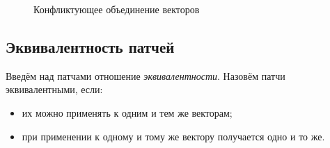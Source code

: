 \begin{figure}
  \centering
  \caption{Конфликтующее объединение векторов}
  \label{fig:vec-merge-conflict}
\end{figure}


\subsection{Эквивалентность патчей}

Введём над патчами отношение \emph{эквивалентности}. Назовём патчи
эквивалентными, если:

\begin{itemize}
\item их можно применять к одним и тем же векторам;
\item при применении к одному и тому же вектору получается одно и то же.
\end{itemize}

